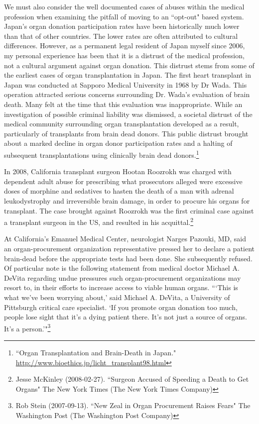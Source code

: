 \documentclass[letterpaper,10pt,twoside]{article}
\begin{document}
We must also consider the well documented cases of abuses within the medical profession when examining the pitfall of moving to an ``opt-out" based system.  Japan's organ donation participation rates have been historically much lower than that of other countries.  The lower rates are often attributed to cultural differences.  However, as a permanent legal resident of Japan myself since 2006, my personal experience has been that it is a distrust of the medical profession, not a cultural argument against organ donation.  This distrust stems from some of the earliest cases of organ transplantation in Japan.  The first heart transplant in Japan was conducted at Sapporo Medical University in 1968 by Dr Wada.  This operation attracted serious concerns surrounding Dr. Wada's evaluation of brain death.  Many felt at the time that this evaluation was inappropriate. While an investigation of possible criminal liability was dismissed, a societal distrust of the medical community surrounding organ transplantation developed as a result, particularly of transplants from brain dead donors. This public distrust brought about a marked decline in organ donor participation rates and a halting of subsequent transplantations using clinically brain dead donors.\footnote{``Organ Transplantation and Brain-Death in Japan." \url{http://www.bioethics.jp/licht_transplant98.html}}

In 2008, California transplant surgeon Hootan Roozrokh was charged with dependent adult abuse for prescribing what prosecutors alleged were excessive doses of morphine and sedatives to hasten the death of a man with adrenal leukodystrophy and irreversible brain damage, in order to procure his organs for transplant. The case brought against Roozrokh was the first criminal case against a transplant surgeon in the US, and resulted in his acquittal.\footnote{Jesse McKinley (2008-02-27). ``Surgeon Accused of Speeding a Death to Get Organs" The New York Times (The New York Times Company)}

At California's Emanuel Medical Center, neurologist Narges Pazouki, MD, said an organ-procurement organization representative pressed her to declare a patient brain-dead before the appropriate tests had been done.  She subsequently refused.  Of particular note is the following statement from medical doctor Michael A. DeVita regarding undue pressures such organ-procurement organizations may resort to, in their efforts to increase access to viable human organs. ```This is what we've been worrying about,' said Michael A. DeVita, a University of Pittsburgh critical care specialist. `If you promote organ donation too much, people lose sight that it's a dying patient there. It's not just a source of organs. It's a person.'"\footnote{Rob Stein (2007-09-13). ``New Zeal in Organ Procurement Raises Fears" The Washington Post (The Washington Post Company)}
\end{document}
